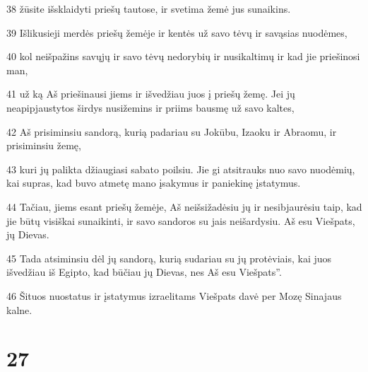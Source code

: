 \par 38 žūsite išsklaidyti priešų tautose, ir svetima žemė jus sunaikins. 
\par 39 Išlikusieji merdės priešų žemėje ir kentės už savo tėvų ir savąsias nuodėmes, 
\par 40 kol neišpažins savųjų ir savo tėvų nedorybių ir nusikaltimų ir kad jie priešinosi man, 
\par 41 už ką Aš priešinausi jiems ir išvedžiau juos į priešų žemę. Jei jų neapipjaustytos širdys nusižemins ir priims bausmę už savo kaltes, 
\par 42 Aš prisiminsiu sandorą, kurią padariau su Jokūbu, Izaoku ir Abraomu, ir prisiminsiu žemę, 
\par 43 kuri jų palikta džiaugiasi sabato poilsiu. Jie gi atsitrauks nuo savo nuodėmių, kai supras, kad buvo atmetę mano įsakymus ir paniekinę įstatymus. 
\par 44 Tačiau, jiems esant priešų žemėje, Aš neišsižadėsiu jų ir nesibjaurėsiu taip, kad jie būtų visiškai sunaikinti, ir savo sandoros su jais neišardysiu. Aš esu Viešpats, jų Dievas. 
\par 45 Tada atsiminsiu dėl jų sandorą, kurią sudariau su jų protėviais, kai juos išvedžiau iš Egipto, kad būčiau jų Dievas, nes Aš esu Viešpats”. 
\par 46 Šituos nuostatus ir įstatymus izraelitams Viešpats davė per Mozę Sinajaus kalne.



\chapter{27}

